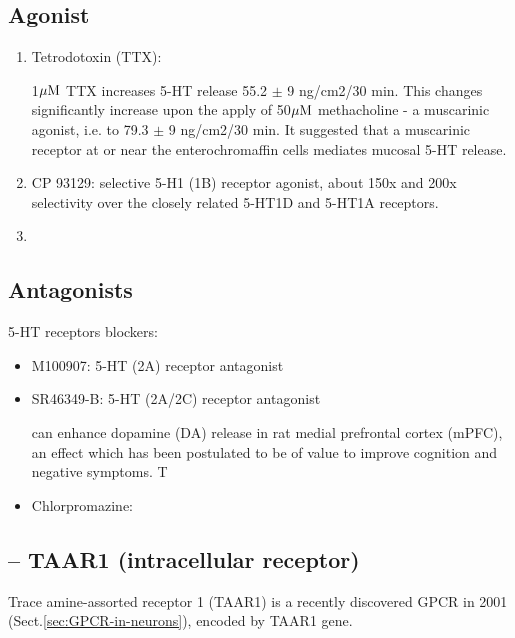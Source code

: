 \subsection{Agonist}

\begin{enumerate}
  
  \item Tetrodotoxin (TTX): 
  
  
  1${\mu\text{M}}$ TTX increases 5-HT release 55.2 $\pm$ 9 ng/cm2/30 min.
  This changes significantly increase upon the apply of 50${\mu\text{M}}$ methacholine -
  a muscarinic agonist, i.e. to 79.3 $\pm$ 9 ng/cm2/30 min.
  It suggested that a muscarinic receptor at or near the enterochromaffin
  cells mediates mucosal 5-HT release. 
  
  
  \item CP 93129: selective 5-H1 (1B) receptor agonist, about
  150x and 200x selectivity over the closely related 5-HT1D and 5-HT1A
  receptors.
  
  \item 
\end{enumerate}

\subsection{Antagonists}

5-HT receptors blockers:
\begin{itemize}
  \item M100907: 5-HT (2A) receptor antagonist
  
  \item  SR46349-B: 5-HT (2A/2C) receptor antagonist
  
  can enhance dopamine (DA) release in rat medial prefrontal cortex (mPFC), an
  effect which has been postulated to be of value to improve cognition and negative symptoms. T
  

  \item Chlorpromazine: 
  
  
\end{itemize}

\subsection{ -- TAAR1 (intracellular receptor)}
\label{sec:TAAR1}

Trace amine-assorted receptor 1 (TAAR1) is a recently discovered GPCR
in 2001 (Sect.\ref{sec:GPCR-in-neurons}), encoded by TAAR1 gene. 

